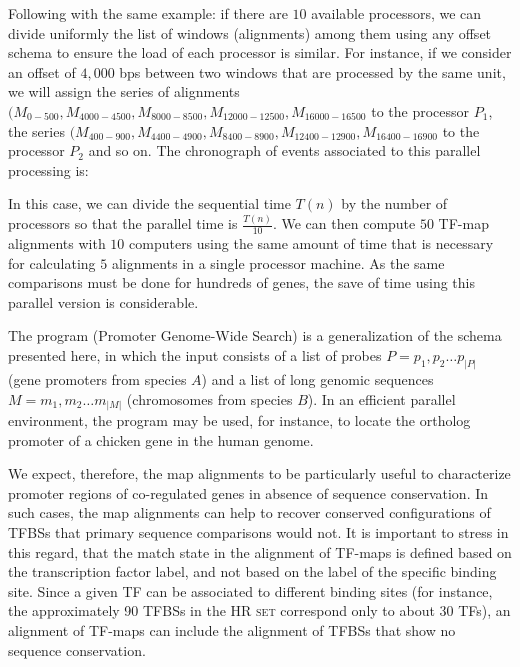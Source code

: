 Following with the same example: if there are $10$ available processors, we can divide
uniformly the list of windows (alignments) among them using any offset schema to
ensure the load of each processor is similar. For instance, if we consider an
offset of $4,000$ bps between two windows that are processed by the same unit,
we will assign the series of alignments 
$(M_{0-500},M_{4000-4500},M_{8000-8500},M_{12000-12500},M_{16000-16500}$
to the processor $P_1$, the series 
$(M_{400-900},M_{4400-4900},M_{8400-8900},M_{12400-12900},M_{16400-16900}$
to the processor $P_2$ and so on. The chronograph of events associated to
this parallel processing is:

\begin{center}
\setlength{\fboxsep}{0pt}
\end{center}

In this case, we can divide the sequential time $T(n)$ by the number of
processors so that the parallel time is $\frac{T(n)}{10}$. We can then
compute $50$ TF-map alignments with $10$ computers using the same amount
of time that is necessary for calculating $5$ alignments in a single processor
machine. As the same comparisons must be done for hundreds of genes, the
save of time using this parallel version is considerable. 

The program  (Promoter Genome-Wide Search) is a generalization of
the schema presented here, in which the input consists of a list of probes
$P=p_1,p_2 \ldots p_{|P|}$ (gene promoters from species $A$) and a list of long
genomic sequences $M=m_1,m_2 \ldots m_{|M|}$ (chromosomes from species $B$).
In an efficient parallel environment, the program  may be used, for 
instance, to locate the ortholog promoter of a chicken gene in the human genome.


\label{sec:cisred}

  
We expect, therefore, the map alignments to be particularly useful to
characterize promoter regions of co-regulated genes in absence of
sequence conservation. In such cases, the map alignments can help to
recover conserved configurations of TFBSs that primary sequence
comparisons would not. It is important to stress in this regard, that
the match state in the alignment of TF-maps is defined based on the
transcription factor label, and not based on the label of the specific
binding site. Since a given TF can be associated to
different binding sites (for instance, the approximately 90 TFBSs in
the \textsc{HR set} correspond only to about 30 TFs), an alignment of TF-maps
can include the alignment of TFBSs that show no sequence conservation.

